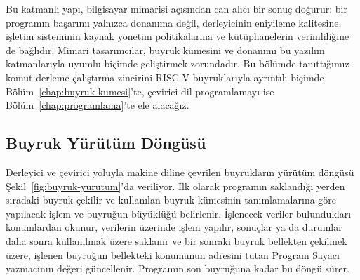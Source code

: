 Bu katmanlı yapı, bilgisayar mimarisi açısından can alıcı bir sonuç doğurur: bir programın başarımı yalnızca donanıma değil, derleyicinin eniyileme kalitesine, işletim sisteminin kaynak yönetim politikalarına ve kütüphanelerin verimliliğine de bağlıdır. Mimari tasarımcılar, buyruk kümesini ve donanımı bu yazılım katmanlarıyla uyumlu biçimde geliştirmek zorundadır. Bu bölümde tanıttığımız komut-derleme-çalıştırma zincirini RISC-V buyruklarıyla ayrıntılı biçimde Bölüm~\ref{chap:buyruk-kumesi}'te, çevirici dil programlamayı ise Bölüm~\ref{chap:programlama}'te ele alacağız.

\subsection{Buyruk Yürütüm Döngüsü}
\label{subsec:buyruk-yurutum-dongusu}

Derleyici ve çevirici yoluyla makine diline çevrilen buyrukların yürütüm döngüsü Şekil~\ref{fig:buyruk-yurutum}'da veriliyor. İlk olarak programın saklandığı yerden sıradaki buyruk çekilir ve kullanılan buyruk kümesinin tanımlamalarına göre yapılacak işlem ve buyruğun büyüklüğü belirlenir. İşlenecek veriler bulundukları konumlardan okunur, verilerin üzerinde işlem yapılır, sonuçlar ya da durumlar daha sonra kullanılmak üzere saklanır ve bir sonraki buyruk bellekten çekilmek üzere, işlenen buyruğun bellekteki konumunun adresini tutan Program Sayacı yazmacının değeri güncellenir. Programın son buyruğuna kadar bu döngü sürer.

